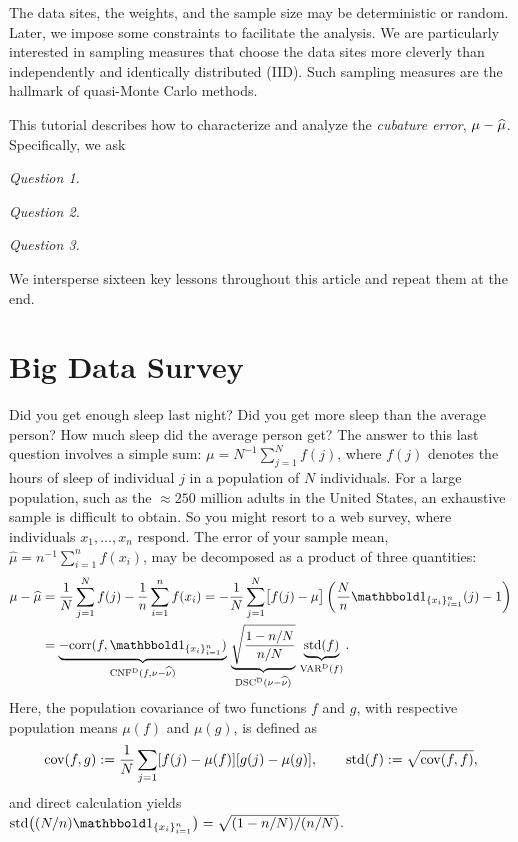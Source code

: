 \documentclass[graybox,footinfo]{svmult}
\begin{document}
The data sites, the 
weights, and the sample size may be deterministic or random.  Later, we impose some 
constraints to facilitate 
the analysis.  We are 
particularly interested in sampling measures that choose the data sites more cleverly 
than independently and identically distributed (IID).  Such sampling measures are the 
hallmark of quasi-Monte Carlo methods.

This tutorial describes how to characterize and analyze the \emph{cubature error}, $\mu 
- \widehat{\mu}$.  
Specifically, we ask
\begin{list}{}{\setlength\leftmargin{7ex}\setlength{}}
\item[\emph{Question 1.}] \emph{\FJHQOne}
\item[\emph{Question 2.}] \emph{\FJHQTwo}
\item[\emph{Question 3.}] \emph{\FJHQThree}
\end{list}
\noindent We intersperse sixteen key lessons throughout this 
article and repeat them at the end.

\section{Big Data Survey} \label{FJH:sec:sleep} 
Did you get enough sleep last night?  Did you get more sleep than the average person?  
How much sleep did the average person get? The answer to this last question involves a 
simple sum:  $\mu = N^{-1} \sum_{j=1}^N f(j)$, where $f(j)$ 
denotes the hours of sleep of 
individual 
$j$ in a population of $N$ individuals.  For a large population, such as the $\approx 250$ 
million adults in the United States, an exhaustive sample is difficult to obtain. So you 
might resort to a 
web survey, where individuals $x_1, \ldots, x_n$ respond.  The error of 
your sample mean, $\widehat{\mu} = n^{-1} \sum_{i=1}^n f(x_i)$, may be decomposed as 
a 
product of three quantities:
\begin{align}
\nonumber
\mu - \widehat{\mu} 
&= \frac{1}N \sum_{j=1}^N f(j) -  \frac 1n \sum_{i=1}^n f(x_i)  = - \frac{1}N \sum_{j=1}^N \bigl[ f(j) 
- \mu \bigr]\left ( \frac Nn \bbone_{\{x_i\}_{i=1}^n}(j) 
- 1 \right) \\
& = \underbrace{-\corr(f, \bbone_{\{x_i\}_{i=1}^n})}_{\algn^\Dt(f,\nu - \hnu)} \,
\underbrace{\sqrt{\frac{1 - n/N}{n/N}}}_{\disc^\Dt(\nu - \hnu)} \, 
\underbrace{\std(f)}_{\Var^\Dt(f)}.
\label{FJH:eq:surveydettrio}
\end{align}
Here, the population covariance of two functions $f$ and $g$, with respective 
population means $\mu(f)$ and $\mu(g)$, is defined as 
\begin{equation*}
\textup{cov}(f,g) : = \frac 1N \sum_{j=1} [f(j) - \mu(f)] [g(j) - \mu(g)], \qquad 
\textup{std}(f) : = \sqrt{\textup{cov}(f,f)},
\end{equation*}
and direct calculation yields $\std\bigl((N/n)\bbone_{\{x_i\}_{i=1}^n}\bigr) = 
\sqrt{(1 - n/N)/(n/N)}$.
\end{document}
